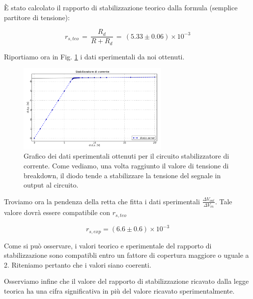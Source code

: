È stato calcolato il rapporto di stabilizzazione teorico dalla formula (semplice partitore di tensione): 

\begin{equation}
r_{s,teo}\,=\,\frac{R_d}{R+R_d}\,=\, (5.33 \pm 0.06) \times 10^{-3}
\label{RS_teo}
\end{equation}

Riportiamo ora in Fig. \ref{fig:stabilizer} i dati sperimentali da noi ottenuti.

\begin{figure}[h]
\center
	\includegraphics[width=0.66\textwidth]{stabilizer.pdf}
	\caption{Grafico dei dati sperimentali ottenuti per il circuito stabilizzatore di corrente. Come vediamo, una volta raggiunto il valore di tensione di breakdown, il diodo tende a stabilizzare la tensione del segnale in output al circuito.}
	\label{fig:stabilizer}
\end{figure}

\noindent Troviamo ora la pendenza della retta che fitta i dati sperimentali $\frac{\Delta V_{out}}{\Delta V_{in}}$. Tale valore dovrà essere compatibile con $r_{s,teo}$

$$r_{s,exp}= (6.6 \pm 0.6) \times 10^{-3} $$

Come si può osservare, i valori teorico e sperimentale del rapporto di stabilizzazione sono compatibli entro un fattore di copertura maggiore o uguale a 2. Riteniamo pertanto che i valori siano coerenti.

Osserviamo infine che il valore del rapporto di stabilizzazione ricavato dalla legge teorica ha una cifra significativa in più del valore ricavato sperimentalmente.